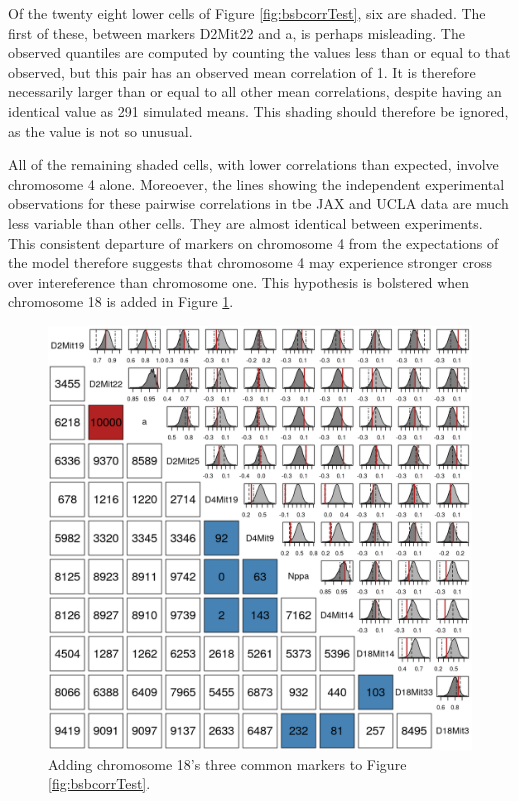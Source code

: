 \documentclass[sts]{imsart}
\begin{document}
Of the twenty eight lower cells of Figure \ref{fig:bsbcorrTest}, six are shaded. The first of these, between markers D2Mit22 and a, is perhaps misleading. The observed quantiles are computed by counting the values less than or equal to that observed, but this pair has an observed mean correlation of 1. It is therefore necessarily larger than or equal to all other mean correlations, despite having an identical value as 291 simulated means. This shading should therefore be ignored, as the value is not so unusual.

All of the remaining shaded cells, with lower correlations than expected, involve chromosome 4 alone. Moreoever, the lines showing the independent experimental observations for these pairwise correlations in tbe JAX and UCLA data are much less variable than other cells. They are almost identical between experiments. This consistent departure of markers on chromosome 4 from the expectations of the model therefore suggests that chromosome 4 may experience stronger cross over intereference than chromosome one. This hypothesis is bolstered when chromosome 18 is added in Figure \ref{fig:bsbcorrTestBig}.

\begin{figure}[htp]
  \begin{center}
      \includegraphics[scale = 0.5]{../img/bsbCorrTestBig.png}
  \end{center}
  \caption{Adding chromosome 18's three common markers to Figure \ref{fig:bsbcorrTest}.}
  \label{fig:bsbcorrTestBig}
\end{figure}
\end{document}
